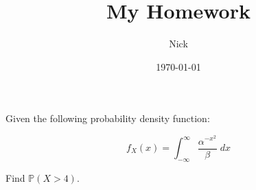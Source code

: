 \documentclass{article}
\title{My Homework}
\author{Nick}
\date{\today}
\begin{document}
\maketitle

Given the following probability density function:

\[
    f_X(x)=\int^\infty_{-\infty}\frac{\alpha^{-x^2}}{\beta}\;dx
\]

Find $\mathbb{P}(X>4)$.
\end{document}
